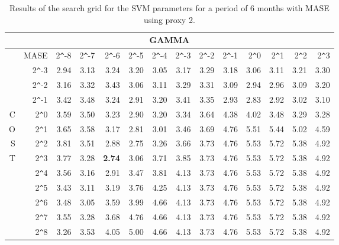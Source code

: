 \begin{table}[h!]
\centering
\begin{adjustbox}{width=\textwidth}
\begin{tabular}{|r|r|rrrrrrrrrrrr|}
\hline
\multicolumn{14}{|c|}{GAMMA} \tabularnewline
\hline
    &MASE& 2\verb|^|-8 & 2\verb|^|-7 & 2\verb|^|-6 & 2\verb|^|-5 & 2\verb|^|-4 & 2\verb|^|-3 & 2\verb|^|-2 & 2\verb|^|-1 & 2\verb|^|0 & 2\verb|^|1 & 2\verb|^|2 & 2\verb|^|3 \\ 
  \hline
  &2\verb|^|-3 & 2.94 & 3.13 & 3.24 & 3.20 & 3.05 & 3.17 & 3.29 & 3.18 & 3.06 & 3.11 & 3.21 & 3.30 \\ 
  &2\verb|^|-2 & 3.16 & 3.32 & 3.43 & 3.06 & 3.11 & 3.29 & 3.31 & 3.09 & 2.94 & 2.96 & 3.09 & 3.20 \\ 
  &2\verb|^|-1 & 3.42 & 3.48 & 3.24 & 2.91 & 3.20 & 3.41 & 3.35 & 2.93 & 2.83 & 2.92 & 3.02 & 3.10 \\ 
  C&2\verb|^|0 & 3.59 & 3.50 & 3.23 & 2.90 & 3.20 & 3.34 & 3.64 & 4.38 & 4.02 & 3.48 & 3.29 & 3.28 \\ 
  O&2\verb|^|1 & 3.65 & 3.58 & 3.17 & 2.81 & 3.01 & 3.46 & 3.69 & 4.76 & 5.51 & 5.44 & 5.02 & 4.59 \\ 
  S&2\verb|^|2 & 3.81 & 3.51 & 2.88 & 2.75 & 3.26 & 3.66 & 3.73 & 4.76 & 5.53 & 5.72 & 5.38 & 4.92 \\ 
  T&2\verb|^|3 & 3.77 & 3.28 & \textbf{2.74} & 3.06 & 3.71 & 3.85 & 3.73 & 4.76 & 5.53 & 5.72 & 5.38 & 4.92 \\ 
  &2\verb|^|4 & 3.56 & 3.16 & 2.91 & 3.47 & 3.81 & 4.13 & 3.73 & 4.76 & 5.53 & 5.72 & 5.38 & 4.92 \\ 
  &2\verb|^|5 & 3.43 & 3.11 & 3.19 & 3.76 & 4.25 & 4.13 & 3.73 & 4.76 & 5.53 & 5.72 & 5.38 & 4.92 \\ 
  &2\verb|^|6 & 3.48 & 3.05 & 3.59 & 3.99 & 4.66 & 4.13 & 3.73 & 4.76 & 5.53 & 5.72 & 5.38 & 4.92 \\ 
  &2\verb|^|7 & 3.55 & 3.28 & 3.68 & 4.76 & 4.66 & 4.13 & 3.73 & 4.76 & 5.53 & 5.72 & 5.38 & 4.92 \\ 
  &2\verb|^|8 & 3.26 & 3.53 & 4.05 & 5.00 & 4.66 & 4.13 & 3.73 & 4.76 & 5.53 & 5.72 & 5.38 & 4.92 \\ 
   \hline
\end{tabular}
\end{adjustbox}
\caption{Results of the search grid for the SVM parameters for a period of 6 months with MASE using proxy 2.}
\end{table}